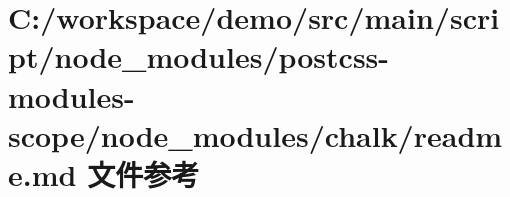 \hypertarget{node__modules_2postcss-modules-scope_2node__modules_2chalk_2_r_e_a_d_m_e_8md}{}\section{C\+:/workspace/demo/src/main/script/node\+\_\+modules/postcss-\/modules-\/scope/node\+\_\+modules/chalk/readme.md 文件参考}
\label{node__modules_2postcss-modules-scope_2node__modules_2chalk_2_r_e_a_d_m_e_8md}
